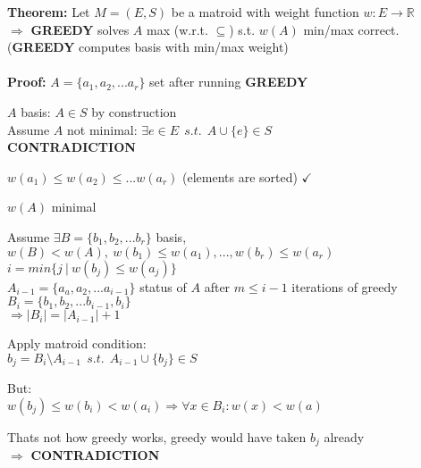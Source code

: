 \textbf{Theorem: } Let $M=(E, S)$ be a matroid with weight function $w:E\rightarrow \mathbb{R}$\\
$\Rightarrow$ \textbf{GREEDY} solves $A$ max (w.r.t. $\subseteq$) s.t. $w(A)$ min/max correct. (\textbf{GREEDY} computes basis with min/max weight)\\\\
\textbf{Proof: } $A=\{a_1, a_2, ... a_r\}$ set after running \textbf{GREEDY}
\begin{compactenum}
	\item{
		\begin{compactenum}[(a)]
			\item{$A$ basis: $A\in S$ by construction\\
			Assume $A$ not minimal: $\exists e \in E~~s.t.~~A\cup\{e\}\in S$\\ \textbf{CONTRADICTION}
			}
			\item{$w(a_1)\le w(a_2) \le ... w(a_r)$ (elements are sorted) $\checkmark$}
			\item{$w(A)$ minimal}
		\end{compactenum}
	\item{Assume $\exists B = \{b_1, b_2, ... b_r\}$ basis, $w(B) < w(A),~ w(b_1)\le w(a_1), ... , w(b_r)\le w(a_r)$\\
	$i=min\{j ~|~ w(b_j)\le w(a_j)\}$}\\
	$A_{i-1}=\{a_a, a_2, ... a_{i-1}\}$ status of $A$ after $m\le i-1$ iterations of greedy\\
	$B_i = \{b_1, b_2, ... b_{i-1}, b_i\}$\\
	$\Rightarrow |B_i| = |A_{i-1}|+1$
	}
	\item{Apply matroid condition:\\
	$b_j = B_i \setminus A_{i-1}~~s.t.~~A_{i-1}\cup \{b_j\}\in S$}
	\item{But:\\
	$w(b_j)\le w(b_i) < w(a_i) \Rightarrow \forall x \in B_i : w(x) < w(a)$}
	\item{Thats not how greedy works, greedy would have taken $b_j$ already\\
	$\Rightarrow$ \textbf{CONTRADICTION}}
\end{compactenum}


